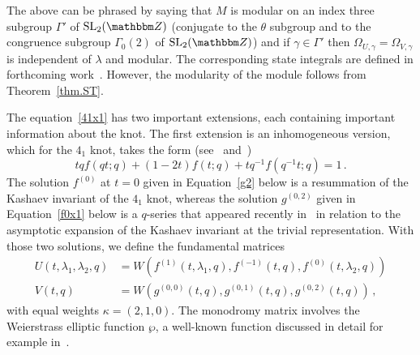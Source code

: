\documentclass[12pt,reqno]{amsart}
\theoremstyle{definition}
\def\SG#1{\textcolor[rgb]{1.00,0.00,0.00}{[SG:#1]}}
\def\CW#1{\textcolor[rgb]{1.00,0.00,0.00}{[CW:#1]}}
\def\BZ{\mathbbm Z}
\def\SL{\mathrm{SL}}
\def\be{\begin{equation}}
\def\ee{\end{equation}}
\def\Om{\Omega}
\begin{document}
The above can be phrased by saying that $M$ is modular on an index three subgroup
$\Gamma'$ of $\SL_2(\BZ)$ (conjugate to the $\theta$ subgroup and to the congruence
subgroup $\Gamma_0(2)$ of $\SL_2(\BZ)$) 
and if $\gamma \in \Gamma'$ then $\Om_{U,\gamma}=\Om_{V,\gamma}$ is independent of
$\lambda$ and modular. The corresponding state integrals are defined in forthcoming
work~\cite{GKZ:cocycle}. However, the modularity of the module follows from
Theorem~\ref{thm.ST}. 

The equation~\eqref{41x1} has two important extensions, each containing important
information about the knot. The first extension is an inhomogeneous version, which
for the $4_1$ knot, takes the form (see~\cite[Eqn.(98)]{GZ:kashaev}
and~\cite[Sec.2.2]{GGMW:trivial})
\be
\label{41x1inhom}
tqf(qt;q) +(1-2t)f(t;q)+ tq^{-1}f(q^{-1}t;q) = 1 \,.
\ee
The solution $f^{(0)}$ at $t=0$ given in Equation~\eqref{g2} below is a resummation
of the Kashaev invariant of the $4_1$ knot, whereas the solution $g^{(0,2)}$ 
given in Equation~\eqref{f0x1} below is a $q$-series that appeared recently
in~\cite{GGMW:trivial} in relation to the asymptotic expansion of the Kashaev
invariant at the trivial representation. With those two solutions, we define
the fundamental matrices
\be
\label{UVex41b}
\begin{aligned}
  U(t,\lambda_{1},\lambda_{2},q)
  &=W(f^{(1)}(t,\lambda_{1},q),f^{(-1)}(t,q),f^{(0)}(t,\lambda_{2},q)) \\
V(t,q) &= W(g^{(0,0)}(t,q), g^{(0,1)}(t,q), g^{(0,2)}(t,q)) \,,
\end{aligned}
\ee
with equal weights $\kappa=(2,1,0)$. The monodromy matrix involves the Weierstrass
elliptic function $\wp$, a well-known function discussed in detail for example
in~\cite{Akhiezer}.
\end{document}
